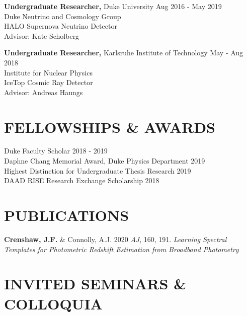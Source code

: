 \documentclass[margin]{res}
\begin{document}
\begin{resume}
\textbf{Undergraduate Researcher,} Duke University \hfill Aug 2016 - May 2019 \\
Duke Neutrino and Cosmology Group \\
HALO Supernova Neutrino Detector \\
Advisor: Kate Scholberg 

\textbf{Undergraduate Researcher,} Karlsruhe Institute of Technology \hfill May - Aug 2018 \\
Institute for Nuclear Physics \\
IceTop Cosmic Ray Detector \\
Advisor: Andreas Haungs

\section{\normalfont FELLOWSHIPS \& AWARDS}
\textbullet{} Duke Faculty Scholar \hfill 2018 - 2019 \\
\textbullet{} Daphne Chang Memorial Award, Duke Physics Department \hfill 2019 \\
\textbullet{} Highest Distinction for Undergraduate Thesis Research \hfill 2019 \\
\textbullet{} DAAD RISE Research Exchange Scholarship \hfill 2018 \\

\section{\normalfont PUBLICATIONS}

\textbf{Crenshaw, J.F.} \& Connolly, A.J. 2020 \textit{AJ}, 160, 191. \textit{Learning Spectral Templates for Photometric Redshift Estimation from Broadband Photometry}

\section{\normalfont INVITED SEMINARS \& COLLOQUIA}


\end{resume}
\end{document}
